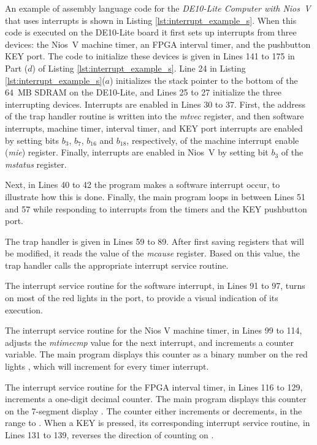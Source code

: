 \documentclass[11pt, twoside, pdftex]{article}
\newcommand{\DEBoard}{DE10-Lite}
\newcommand{\systemNameFull}{DE10-Lite Computer with Nios~V}
\begin{document}
An example of assembly language code for the {\it \systemNameFull} that uses interrupts is
shown in Listing \ref{lst:interrupt_example_s}. When this code is executed on the
{\DEBoard} board it first sets up interrupts from three devices: the Nios~V machine timer, 
an FPGA interval timer, and the pushbutton KEY port. The code to initialize these devices
is given in Lines 141 to 175 in Part ($d$) of Listing \ref{lst:interrupt_example_s}. 
Line 24 in Listing \ref{lst:interrupt_example_s}($a$) initializes the stack pointer to
the bottom of the 64~MB SDRAM on the {\DEBoard}, and Lines 25 to 27 initialize the
three interrupting devices. Interrupts are enabled in Lines 30 to 37. First, the address of
the trap handler routine is written into the {\it mtvec} register, and then software
interrupts, machine timer, interval timer, and KEY port interrupts are
enabled by setting bits $b_3$, $b_7$, $b_{16}$ and $b_{18}$, respectively, of the 
machine interrupt enable ({\it mie}) register. 
Finally, interrupts are enabled in Nios~V by setting bit $b_3$ of the {\it mstatus} register.

Next, in Lines 40 to 42 the program makes a software 
interrupt occur, to illustrate how this is done. Finally, the main program loops in
between Lines 51 and 57 while responding to interrupts from the timers and the 
KEY pushbutton port. 

The trap handler is given in Lines 59 to 89. After first saving registers that will be
modified, it reads the value of the {\it mcause} register. Based on this value, the trap
handler calls the appropriate interrupt service routine. 

The interrupt service routine for the software interrupt, in Lines 91 to 97, 
turns on most of the red lights in the  port, to provide a visual indication of 
its execution. 

The interrupt service routine for the Nios V machine timer, in Lines 99 to 114,
adjusts the {\it mtimecmp} value for the next interrupt, and 
increments a counter variable. The main program displays this counter as a binary number 
on the red lights , which will increment for every timer interrupt.

The interrupt service routine for the FPGA interval timer, in Lines 116 to 129,
increments a one-digit decimal counter. The main program displays this counter on the 
7-segment display . The counter either increments or decrements,
in the range  to .  When a KEY is pressed, its corresponding 
interrupt service routine, in Lines 131 to 139, reverses the direction of counting on . 
\end{document}
